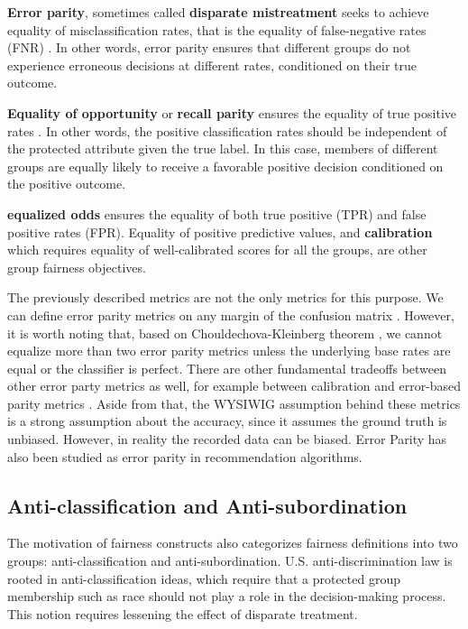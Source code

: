         \textbf{Error parity}, sometimes called \textbf{disparate mistreatment} seeks to achieve equality of misclassification rates, that is the equality of false-negative rates (FNR) \cite{zafar2017fairness}. In other words, error parity ensures that different groups do not experience erroneous decisions at different rates, conditioned on their true outcome.
        
        \textbf{Equality of opportunity} or \textbf{recall parity} ensures the equality of true positive rates \cite{hardt2016equality}. In other words, the positive classification rates should be independent of the protected attribute given the true label. In this case, members of different groups are equally likely to receive a favorable positive decision conditioned on the positive outcome.
        
        \textbf{equalized odds} \cite{hardt2016equality} ensures the equality of both true positive (TPR) and false positive rates (FPR). Equality of positive predictive values, and \textbf{calibration} \cite{Kleinberg:InherentTrade} which requires equality of well-calibrated scores for all the groups, are other group fairness objectives.
        
        The previously described metrics are not the only metrics for this purpose. We can define error parity metrics on any margin of the confusion matrix \cite{mitchell2021algorithmic}. However, it is worth noting that, based on Chouldechova-Kleinberg theorem \cite{chouldechova2017fair,Kleinberg:InherentTrade}, we cannot equalize more than two error parity metrics unless the underlying base rates are equal or the classifier is perfect. There are other fundamental tradeoffs between other error party metrics as well, for example between calibration and error-based parity metrics \cite{pleiss2017fairness}. Aside from that, the WYSIWIG assumption behind these metrics is a strong assumption about the accuracy, since it assumes the ground truth is unbiased. However, in reality the recorded data can be biased. Error Parity has also been studied as error parity in recommendation algorithms\cite{ekstrand2018all,yao_huang_fatml-2017}.

    
    \subsection{Anti-classification and Anti-subordination}
        
        The motivation of fairness constructs also categorizes fairness definitions into two groups: anti-classification and anti-subordination. U.S. anti-discrimination law is rooted in anti-classification ideas, which require that a protected group membership such as race should not play a role in the decision-making process. This notion requires lessening the effect of disparate treatment.
        
